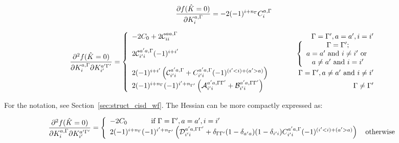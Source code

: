 \documentclass[a4paper,11pt]{article}
\begin{document}
\begin{equation}
  \frac{\partial f(\hat{K} = 0)}{\partial K_i^{a,\Gamma}} = -2(-1)^{i + n_{\Gamma}} C_i^{a,\Gamma}
\end{equation}

\begin{equation}
  \frac{\partial^2 f(\hat{K} = 0)}{\partial K_i^{a,\Gamma} \partial K_{i'}^{a'{\Gamma'}}} =
  \left\{
    \begin{array}{lcr}
      -2 C_0 + 2 \mathcal{C}_{ii}^{aa, \Gamma} & \quad\quad & \Gamma = {\Gamma'}, a=a', i=i'\\
      2 \mathcal{C}_{i'i}^{a'a, \Gamma} (-1)^{i + i'} & \quad\quad &
      \left\{\begin{array}{c}
              \Gamma = {\Gamma'};\\
              a=a'\text{ and }i\ne i'\text{ or }\\
              a \ne a'\text{ and }i = i'
            \end{array}
      \right.\\
      2  (-1)^{i + i'} \left(\mathcal{C}_{i'i}^{a'a, \Gamma} +
      C_{i'i}^{a'a, \Gamma} (-1)^{(i'<i) + (a'>a)}\right) & \quad\quad &
      \Gamma = {\Gamma'}, a \ne a'\text{ and }i\ne i'\\
      2 (-1)^{i+n_{\Gamma}}(-1)^{i'+n_{\Gamma'}}
      \left( \mathcal{A}_{i'i}^{a'a, \Gamma{\ensuremath{\Gamma'}}} + \mathcal{B}_{i'i}^{a'a, \Gamma{\ensuremath{\Gamma'}}} \right) & \quad\quad &
      \Gamma \ne {\ensuremath{\Gamma'}}
    \end{array}
  \right.
\end{equation}

For the notation, see Section~\ref{sec:struct_cisd_wf}.
The Hessian can be more compactly expressed as:

\begin{equation}
  \frac{\partial^2 f(\hat{K} = 0)}{\partial K_i^{a,\Gamma} \partial K_{i'}^{a'{\Gamma'}}} =
  \left\{
    \begin{array}{l}
      -2 C_0 \quad\quad\quad \text{ if }\Gamma = {\Gamma'}, a=a', i=i'\\
      2 (-1)^{i+n_{\Gamma}}(-1)^{i'+n_{\Gamma'}} \left( \mathcal{D}_{i'i}^{a'a, \Gamma{\ensuremath{\Gamma'}}} +
      \delta_{\Gamma{\ensuremath{\Gamma'}}}(1 - \delta_{a'a})(1 - \delta_{i'i})C_{i'i}^{a'a, \Gamma} (-1)^{(i'<i) + (a'>a)}\right)
             \quad \text{otherwise}
    \end{array}
  \right.
\end{equation}
\end{document}
